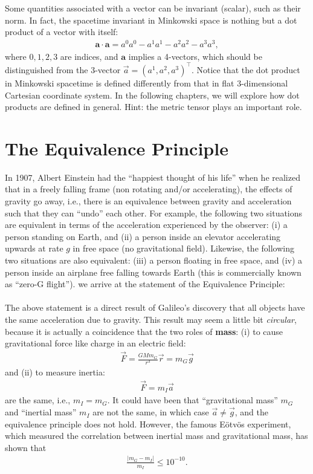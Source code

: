 \documentclass{book}
\theoremstyle{definition}
\begin{document}
Some quantities associated with a vector can be invariant (scalar), such as their norm. In fact, the spacetime invariant in Minkowski space is nothing but a dot product of a vector with itself:
\begin{align*}
\mathbf{a}\cdot\mathbf{a} = a^0a^0 - a^1a^1 - a^2a^2 - a^3a^3,
\end{align*}
where $0,1,2,3$ are indices, and $\mathbf{a}$ implies a 4-vectors, which should be distinguished from the 3-vector $\vec{a} = (a^1,a^2,a^3)^\top$. Notice that the dot product in Minkowski spacetime is defined differently from that in flat 3-dimensional Cartesian coordinate system. In the following chapters, we will explore how dot products are defined in general. Hint: the metric tensor plays an important role.\\ 


\section{The Equivalence Principle}
In 1907, Albert Einstein had the ``happiest thought of his life'' when he realized that in a freely falling frame (non rotating and/or accelerating), the effects of gravity go away, i.e., there is an equivalence between gravity and acceleration such that they can ``undo'' each other. For example, the following two situations are equivalent in terms of the acceleration experienced by the observer: (i) a person standing on Earth, and (ii) a person inside an elevator accelerating upwards at rate $g$ in free space (no gravitational field). Likewise, the following two situations are also equivalent: (iii) a person floating in free space, and (iv) a person inside an airplane free falling towards Earth (this is commercially known as ``zero-G flight''). we arrive at the statement of the Equivalence Principle: \\

\noindent {}\\

The above statement is a direct result of Galileo's discovery that all objects have the same acceleration due to gravity. This result may seem a little bit \textit{circular}, because it is actually a coincidence that the two roles of \textbf{mass}: (i) to cause gravitational force like charge in an electric field:
\begin{align*}
\vec{F} = \frac{GMm_G}{r^3}\vec{r} = m_G\vec{g}
\end{align*}
and (ii) to measure inertia:
\begin{align*}
\vec{F} = m_I\vec{a}
\end{align*}
are the same, i.e., $m_I = m_G$. It could have been that ``gravitational mass'' $m_G$ and ``inertial mass'' $m_I$ are not the same, in which case $\vec{a} \neq \vec{g}$, and the equivalence principle does not hold. However, the famous E\"{o}tv\"{o}s experiment, which measured the correlation between inertial mass and gravitational mass, has shown that
\begin{align*}
\frac{\vert m_G - m_I\vert}{m_I} \leq 10^{-10}.
\end{align*}
\end{document}
